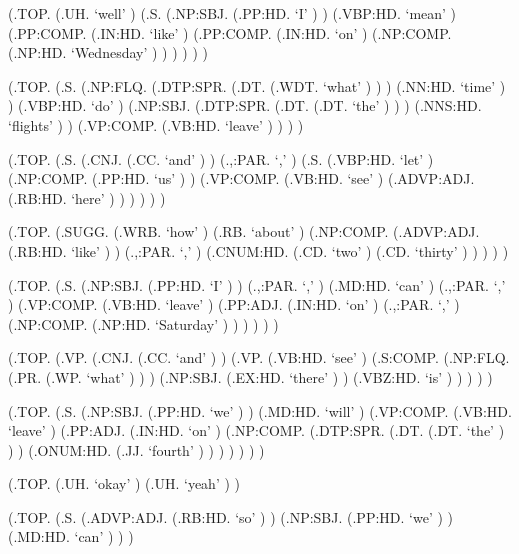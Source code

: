\documentclass[10pt]{article}
\begin{document}
\begin{parsetree}  (.TOP. (.UH. `well' ) (.S. (.NP:SBJ. (.PP:HD. `I' ) ) (.VBP:HD. `mean' ) (.PP:COMP. (.IN:HD. `like' ) (.PP:COMP. (.IN:HD. `on' ) (.NP:COMP. (.NP:HD. `Wednesday' ) ) ) ) ) ) \end{parsetree}

\begin{parsetree}  (.TOP. (.S. (.NP:FLQ. (.DTP:SPR. (.DT. (.WDT. `what' ) ) ) (.NN:HD. `time' ) ) (.VBP:HD. `do' ) (.NP:SBJ. (.DTP:SPR. (.DT. (.DT. `the' ) ) ) (.NNS:HD. `flights' ) ) (.VP:COMP. (.VB:HD. `leave' ) ) ) ) \end{parsetree}

\begin{parsetree}  (.TOP. (.S. (.CNJ. (.CC. `and' ) ) (.,:PAR. `,' ) (.S. (.VBP:HD. `let' ) (.NP:COMP. (.PP:HD. `us' ) ) (.VP:COMP. (.VB:HD. `see' ) (.ADVP:ADJ. (.RB:HD. `here' ) ) ) ) ) ) \end{parsetree}

\begin{parsetree}  (.TOP. (.SUGG. (.WRB. `how' ) (.RB. `about' ) (.NP:COMP. (.ADVP:ADJ. (.RB:HD. `like' ) ) (.,:PAR. `,' ) (.CNUM:HD. (.CD. `two' ) (.CD. `thirty' ) ) ) ) ) \end{parsetree}

\begin{parsetree}  (.TOP. (.S. (.NP:SBJ. (.PP:HD. `I' ) ) (.,:PAR. `,' ) (.MD:HD. `can' ) (.,:PAR. `,' ) (.VP:COMP. (.VB:HD. `leave' ) (.PP:ADJ. (.IN:HD. `on' ) (.,:PAR. `,' ) (.NP:COMP. (.NP:HD. `Saturday' ) ) ) ) ) ) \end{parsetree}

\begin{parsetree}  (.TOP. (.VP. (.CNJ. (.CC. `and' ) ) (.VP. (.VB:HD. `see' ) (.S:COMP. (.NP:FLQ. (.PR. (.WP. `what' ) ) ) (.NP:SBJ. (.EX:HD. `there' ) ) (.VBZ:HD. `is' ) ) ) ) ) \end{parsetree}

\begin{parsetree}  (.TOP. (.S. (.NP:SBJ. (.PP:HD. `we' ) ) (.MD:HD. `will' ) (.VP:COMP. (.VB:HD. `leave' ) (.PP:ADJ. (.IN:HD. `on' ) (.NP:COMP. (.DTP:SPR. (.DT. (.DT. `the' ) ) ) (.ONUM:HD. (.JJ. `fourth' ) ) ) ) ) ) ) \end{parsetree}

\begin{parsetree}  (.TOP. (.UH. `okay' ) (.UH. `yeah' ) ) \end{parsetree}

\begin{parsetree}  (.TOP. (.S. (.ADVP:ADJ. (.RB:HD. `so' ) ) (.NP:SBJ. (.PP:HD. `we' ) ) (.MD:HD. `can' ) ) ) \end{parsetree}
\end{document}
